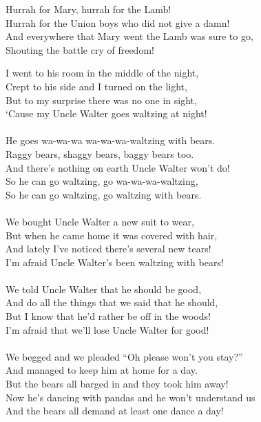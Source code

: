 \documentclass[twoside,13pt,openany,letterpaper]{memoir}%
\begin{document}
\chorusmarker
Hurrah for Mary, hurrah for the Lamb!\\
Hurrah for the Union boys who did not give a damn!\\
And everywhere that Mary went the Lamb was sure to go,\\
Shouting the battle cry of freedom!\\


I went to his room in the middle of the night,\\
Crept to his side and I turned on the light,\\
But to my surprise there was no one in sight,\\
‘Cause my Uncle Walter goes waltzing at night!\\
\\
\chorusmarker
He goes wa-wa-wa wa-wa-wa-waltzing with bears.\\
Raggy bears, shaggy bears, baggy bears too.\\
And there's nothing on earth Uncle Walter won't do!\\
So he can go waltzing, go wa-wa-wa-waltzing,\\
So he can go waltzing, go waltzing with bears.\\
\\
We bought Uncle Walter a new suit to wear,\\
But when he came home it was covered with hair,\\
And lately I've noticed there's several new tears!\\
I’m afraid Uncle Walter's been waltzing with bears!\\
\\
We told Uncle Walter that he should be good,\\
And do all the things that we said that he should,\\
But I know that he'd rather be off in the woods!\\
I'm afraid that we’ll lose Uncle Walter for good!\\
\\
We begged and we pleaded “Oh please won’t you stay?”\\
And managed to keep him at home for a day.\\
But the bears all barged in and they took him away!\\
Now he's dancing with pandas and he won’t understand us\\
And the bears all demand at least one dance a day!\\
\end{document}
